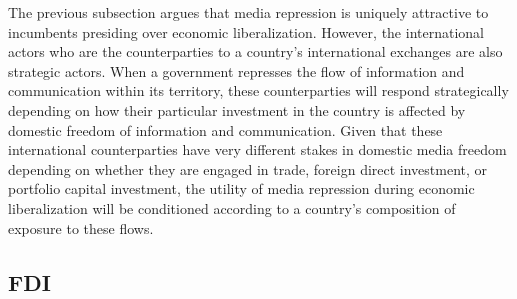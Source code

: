 \documentclass[12pt,a4paper]{article}\usepackage[]{graphicx}\usepackage[]{color}
\begin{document}
The previous subsection argues that media repression is uniquely attractive to incumbents presiding over economic liberalization. However, the international actors who are the counterparties to a country's international exchanges are also strategic actors. When a government represses the flow of information and communication within its territory, these counterparties will respond strategically depending on how their particular investment in the country is affected by domestic freedom of information and communication. Given that these international counterparties have very different stakes in domestic media freedom depending on whether they are engaged in trade, foreign direct investment, or portfolio capital investment, the utility of media repression during economic liberalization will be conditioned according to a country's composition of exposure to these flows.

\subsection{FDI}
\end{document}
